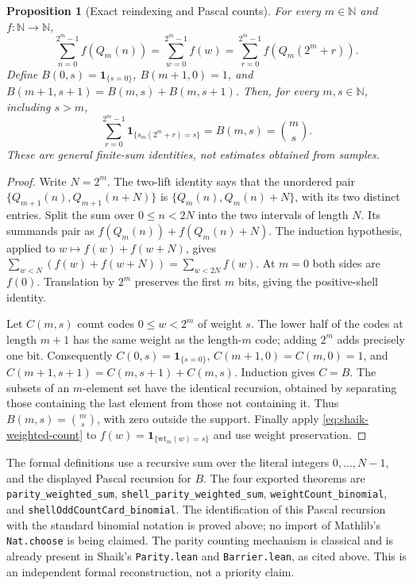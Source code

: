\documentclass[11pt]{article}
\newtheorem{proposition}{Proposition}
\theoremstyle{remark}\newtheorem{remark}[proposition]{Remark}
\begin{document}
\begin{proposition}[Exact reindexing and Pascal counts]
\label{prop:shaik-weighted-count}
For every \(m\in\mathbb N\) and \(f:\mathbb N\to\mathbb N\),
\begin{equation}\label{eq:shaik-weighted-count}
 \sum_{n=0}^{2^m-1}f(Q_m(n))
 =\sum_{w=0}^{2^m-1}f(w)
 =\sum_{r=0}^{2^m-1}f(Q_m(2^m+r)).
\end{equation}
Define \(B(0,s)=\mathbf1_{\{s=0\}}\),
\(B(m+1,0)=1\), and
\(B(m+1,s+1)=B(m,s)+B(m,s+1)\).
Then, for every \(m,s\in\mathbb N\), including \(s>m\),
\[
 \sum_{r=0}^{2^m-1}\mathbf1_{\{s_m(2^m+r)=s\}}
 =B(m,s)=\binom ms .
\]
These are general finite-sum identities, not estimates obtained from samples.
\end{proposition}
\begin{proof}
Write \(N=2^m\). The two-lift identity says that the unordered pair
\(\{Q_{m+1}(n),Q_{m+1}(n+N)\}\) is
\(\{Q_m(n),Q_m(n)+N\}\), with its two distinct entries.
Split the sum over \(0\le n<2N\) into the two intervals of length \(N\).
Its summands pair as
\(f(Q_m(n))+f(Q_m(n)+N)\).
The induction hypothesis, applied to
\(w\mapsto f(w)+f(w+N)\), gives
\(\sum_{w<N}(f(w)+f(w+N))=\sum_{w<2N}f(w)\).
At \(m=0\) both sides are \(f(0)\).
Translation by \(2^m\) preserves the first \(m\) bits, giving the
positive-shell identity.

Let \(C(m,s)\) count codes \(0\le w<2^m\) of weight \(s\).
The lower half of the codes at length \(m+1\) has the same weight as
the length-\(m\) code; adding \(2^m\) adds precisely one bit.
Consequently \(C(0,s)=\mathbf1_{\{s=0\}}\),
\(C(m+1,0)=C(m,0)=1\), and
\(C(m+1,s+1)=C(m,s+1)+C(m,s)\).
Induction gives \(C=B\). The subsets of an \(m\)-element set have
the identical recursion, obtained by separating those containing the
last element from those not containing it. Thus \(B(m,s)=\binom ms\),
with zero outside the support. Finally apply
\eqref{eq:shaik-weighted-count} to
\(f(w)=\mathbf1_{\{\mathrm{wt}_m(w)=s\}}\) and use weight preservation.
\end{proof}

The formal definitions use a recursive sum over the literal integers
\(0,\ldots,N-1\), and the displayed Pascal recursion for \(B\).
The four exported theorems are
\texttt{parity\_weighted\_sum},
\texttt{shell\_parity\_weighted\_sum},
\texttt{weightCount\_binomial}, and
\texttt{shellOddCountCard\_binomial}.
The identification of this Pascal recursion with the standard binomial
notation is proved above; no import of Mathlib's \texttt{Nat.choose}
is being claimed.
The parity counting mechanism is classical and is already present in
Shaik's \texttt{Parity.lean} and \texttt{Barrier.lean}, as cited above.
This is an independent formal reconstruction, not a priority claim.
\end{document}
